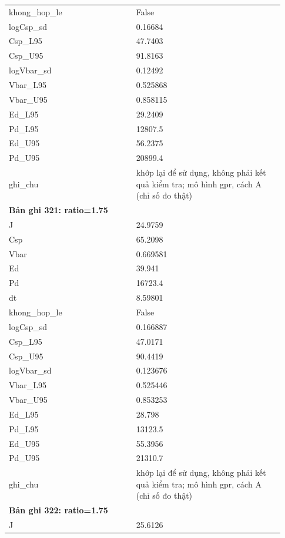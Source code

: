 \begin{longtable}{p{0.43\linewidth}p{0.50\linewidth}}
khong\_\allowbreak hop\_\allowbreak le & False \\
logCsp\_\allowbreak sd & 0.16684 \\
Csp\_\allowbreak L95 & 47.7403 \\
Csp\_\allowbreak U95 & 91.8163 \\
logVbar\_\allowbreak sd & 0.12492 \\
Vbar\_\allowbreak L95 & 0.525868 \\
Vbar\_\allowbreak U95 & 0.858115 \\
Ed\_\allowbreak L95 & 29.2409 \\
Pd\_\allowbreak L95 & 12807.5 \\
Ed\_\allowbreak U95 & 56.2375 \\
Pd\_\allowbreak U95 & 20899.4 \\
ghi\_\allowbreak chu & khớp lại để sử dụng, không phải kết quả kiểm tra; mô hình gpr, cách A (chỉ số đo thật) \\
\midrule
\multicolumn{2}{p{0.95\linewidth}}{\textbf{Bản ghi 321: ratio=1.75}} \\
J & 24.9759 \\
Csp & 65.2098 \\
Vbar & 0.669581 \\
Ed & 39.941 \\
Pd & 16723.4 \\
dt & 8.59801 \\
khong\_\allowbreak hop\_\allowbreak le & False \\
logCsp\_\allowbreak sd & 0.166887 \\
Csp\_\allowbreak L95 & 47.0171 \\
Csp\_\allowbreak U95 & 90.4419 \\
logVbar\_\allowbreak sd & 0.123676 \\
Vbar\_\allowbreak L95 & 0.525446 \\
Vbar\_\allowbreak U95 & 0.853253 \\
Ed\_\allowbreak L95 & 28.798 \\
Pd\_\allowbreak L95 & 13123.5 \\
Ed\_\allowbreak U95 & 55.3956 \\
Pd\_\allowbreak U95 & 21310.7 \\
ghi\_\allowbreak chu & khớp lại để sử dụng, không phải kết quả kiểm tra; mô hình gpr, cách A (chỉ số đo thật) \\
\midrule
\multicolumn{2}{p{0.95\linewidth}}{\textbf{Bản ghi 322: ratio=1.75}} \\
J & 25.6126 \\

\end{longtable}
